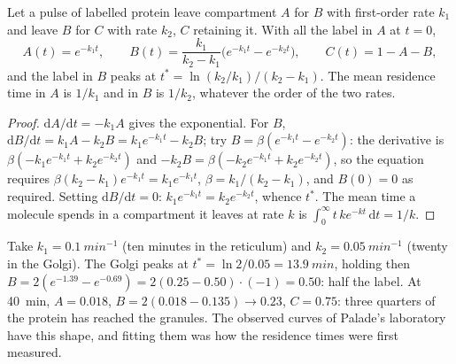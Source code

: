 \begin{theorem}\label{thm:b3:membrane-traffic:pulse-chase}
Let a pulse of labelled protein leave compartment $A$ for $B$ with
first-order rate $k_{1}$ and leave $B$ for $C$ with rate $k_{2}$, $C$
retaining it. With all the label in $A$ at $t = 0$,
\[
A(t) = e^{-k_{1}t},\qquad
B(t) = \frac{k_{1}}{k_{2} - k_{1}}\bigl(e^{-k_{1}t} - e^{-k_{2}t}\bigr),
\qquad
C(t) = 1 - A - B,
\]
and the label in $B$ peaks at $t^{*} = \ln(k_{2}/k_{1})/(k_{2} - k_{1})$.
The mean residence time in $A$ is $1/k_{1}$ and in $B$ is $1/k_{2}$,
whatever the order of the two rates.
\end{theorem}
\begin{proof}
$\mathrm{d}A/\mathrm{d}t = -k_{1}A$ gives the exponential. For $B$,
$\mathrm{d}B/\mathrm{d}t = k_{1}A - k_{2}B = k_{1}e^{-k_{1}t} - k_{2}B$;
try $B = \beta(e^{-k_{1}t} - e^{-k_{2}t})$: the derivative is
$\beta(-k_{1}e^{-k_{1}t} + k_{2}e^{-k_{2}t})$ and $-k_{2}B = \beta(-k_{2}
e^{-k_{1}t} + k_{2}e^{-k_{2}t})$, so the equation requires $\beta(k_{2}
- k_{1})e^{-k_{1}t} = k_{1}e^{-k_{1}t}$, $\beta = k_{1}/(k_{2} -
k_{1})$, and $B(0) = 0$ as required. Setting $\mathrm{d}B/\mathrm{d}t =
0$: $k_{1}e^{-k_{1}t} = k_{2}e^{-k_{2}t}$, whence $t^{*}$. The mean time
a molecule spends in a compartment it leaves at rate $k$ is $\int_{0}^{
\infty} t\,k e^{-kt}\,\mathrm{d}t = 1/k$.
\end{proof}

\begin{example}\label{ex:b3:membrane-traffic:palade}
Take $k_{1} = \qty{0.1}{min^{-1}}$ (ten minutes in the reticulum) and
$k_{2} = \qty{0.05}{min^{-1}}$ (twenty in the Golgi). The Golgi peaks at
$t^{*} = \ln 2/0.05 = \qty{13.9}{min}$, holding then $B = 2(e^{-1.39} -
e^{-0.69}) = 2(0.25 - 0.50)\cdot(-1) = 0.50$: half the label. At
\qty{40}{min}, $A = 0.018$, $B = 2(0.018 - 0.135) \to 0.23$, $C = 0.75$:
three quarters of the protein has reached the granules. The observed
curves of Palade's laboratory have this shape, and fitting them was
how the residence times were first measured.
\end{example}

